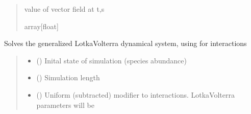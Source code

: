 \documentclass[letterpaper,10pt,english]{sphinxmanual}
\begin{document}
\begin{fulllineitems}
\begin{fulllineitems}
\begin{quote}
\begin{description}
\begin{itemize}
\end{itemize}

\sphinxAtStartPar
value of vector field at t,s

\sphinxAtStartPar
array{[}float{]}

\end{description}\end{quote}

\end{fulllineitems}


\begin{fulllineitems}
\label{\detokenize{friendlynets:friendlyNet.friendlyNet.solve_lotka_volterra}}
\pysigstartsignatures
{}
\pysigstopsignatures
\sphinxAtStartPar
Solves the generalized Lotka\sphinxhyphen{}Volterra dynamical system, using {\hyperref[\detokenize{friendlynets:friendlyNet.friendlyNet.Adjacency}]{}} for interactions
\begin{quote}\begin{description}
\begin{itemize}
\item {} 
\sphinxAtStartPar
{} (\sphinxstyleliteralemphasis{\sphinxupquote{{[}}}\sphinxstyleliteralemphasis{\sphinxupquote{{]}}}) \textendash{} Inital state of simulation (species abundance)

\item {} 
\sphinxAtStartPar
{} () \textendash{} Simulation length

\item {} 
\sphinxAtStartPar
{} () \textendash{} Uniform (subtracted) modifier to interactions. Lotka\sphinxhyphen{}Volterra parameters will be {\hyperref[\detokenize{friendlynets:friendlyNet.friendlyNet.Adjacency}]{}} \sphinxhyphen{} 


\end{itemize}
\end{description}
\end{quote}
\end{fulllineitems}
\end{fulllineitems}
\end{document}
